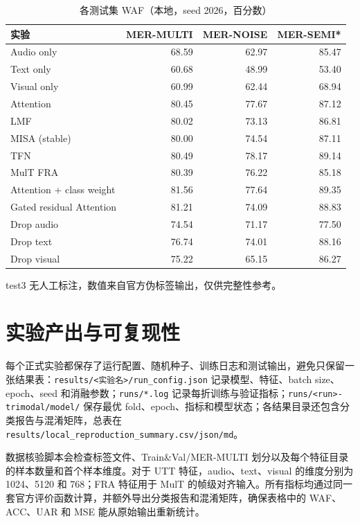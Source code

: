 ﻿\documentclass[a4paper,11pt]{ctexart}
\begin{document}
\begin{table}[htbp]
\centering
\small
\caption{各测试集 WAF（本地，seed 2026，百分数）}
\begin{tabular}{lrrr}
\toprule
实验 & MER-MULTI & MER-NOISE & MER-SEMI*\\
\midrule
Audio only & 68.59 & 62.97 & 85.47\\
Text only & 60.68 & 48.99 & 53.40\\
Visual only & 60.99 & 62.44 & 68.94\\
Attention & 80.45 & 77.67 & 87.12\\
LMF & 80.02 & 73.13 & 86.81\\
MISA (stable) & 80.00 & 74.54 & 87.11\\
TFN & 80.49 & 78.17 & 89.14\\
MulT FRA & 80.39 & 76.22 & 85.18\\
Attention + class weight & 81.56 & 77.64 & 89.35\\
Gated residual Attention & 81.21 & 74.09 & 88.83\\
Drop audio & 74.54 & 71.17 & 77.50\\
Drop text & 76.74 & 74.01 & 88.16\\
Drop visual & 75.22 & 65.15 & 86.27\\
\bottomrule
\end{tabular}
\end{table}

\noindent\scriptsize *test3 无人工标注，数值来自官方伪标签输出，仅供完整性参考。\normalsize

\section{实验产出与可复现性}

每个正式实验都保存了运行配置、随机种子、训练日志和测试输出，避免只保留一张结果表：\texttt{results/<实验名>/run\_config.json} 记录模型、特征、batch size、epoch、seed 和消融参数；\texttt{runs/*.log} 记录每折训练与验证指标；\texttt{runs/<run>-trimodal/model/} 保存最优 fold、epoch、指标和模型状态；各结果目录还包含分类报告与混淆矩阵，总表在 \texttt{results/local\_reproduction\_summary.csv/json/md}。

数据核验脚本会检查标签文件、Train\&Val/MER-MULTI 划分以及每个特征目录的样本数量和首个样本维度。对于 UTT 特征，audio、text、visual 的维度分别为 1024、5120 和 768；FRA 特征用于 MulT 的帧级对齐输入。所有指标均通过同一套官方评价函数计算，并额外导出分类报告和混淆矩阵，确保表格中的 WAF、ACC、UAR 和 MSE 能从原始输出重新统计。
\end{document}
